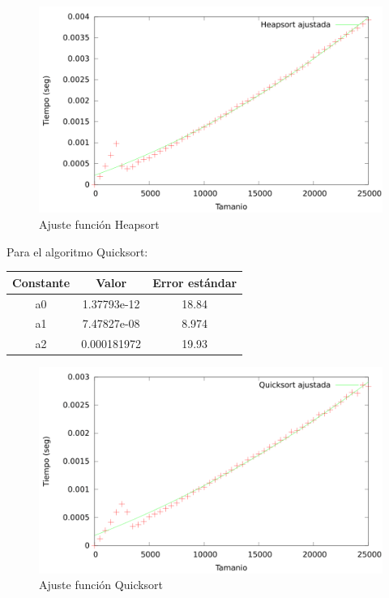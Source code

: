 \documentclass{article}
\begin{document}
	\begin{figure}[H]
		\centering
		\includegraphics[totalheight=8cm]{img/Heapsort_ajustada}
		\caption{Ajuste función Heapsort}
		\label{fig:Heapsort_ajustada}
	\end{figure}

	Para el algoritmo Quicksort:

	\begin{longtable}{|c|c|c|}
		\hline
		Constante		& Valor			& Error estándar	\\ \hline
		a0              & 1.37793e-12	& 18.84 \\ \hline
		a1              & 7.47827e-08	& 8.974 \\ \hline
		a2              & 0.000181972	& 19.93 \\ \hline
	\end{longtable}
	
	

	\begin{figure}[H]
		\centering
		\includegraphics[totalheight=8cm]{img/Quicksort_ajustada}
		\caption{Ajuste función Quicksort}
		\label{fig:Quicksort_ajustada}
	\end{figure}
	
\end{document}
